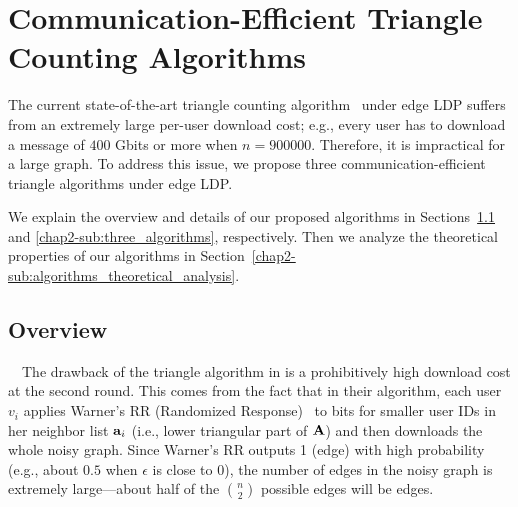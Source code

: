 \section{Communication-Efficient Triangle Counting Algorithms}
\label{chap2-sec:algorithms}
The current state-of-the-art triangle counting algorithm~\cite{Imola_USENIX21} under edge LDP suffers from an extremely large per-user download cost; 
e.g., every user has to download a message of $400$ Gbits or more when $n=900000$. 
Therefore, it is impractical for a large graph. 
To address this issue, we propose three communication-efficient triangle algorithms under edge LDP.

We explain the overview and details of our proposed algorithms in Sections~\ref{chap2-sub:algorithms_overview} and \ref{chap2-sub:three_algorithms}, respectively.
Then we analyze the theoretical properties of our algorithms in Section~\ref{chap2-sub:algorithms_theoretical_analysis}.

\subsection{Overview}
\label{chap2-sub:algorithms_overview}


{}~~The drawback of the triangle algorithm in \cite{Imola_USENIX21} is a prohibitively 
high 
download cost at the second round.
This comes from the fact that
in their algorithm, 
each user $v_i$ applies Warner's RR
(Randomized Response)~\cite{Warner_JASA65} to
bits for smaller user IDs in her neighbor list $\mathbf{a}_i$ (i.e., lower triangular part of $\mathbf{A}$)
and then downloads the whole noisy graph.
Since Warner's RR outputs 1 (edge) with high probability (e.g., about $0.5$ when $\epsilon$ is close to $0$), the
number of edges in the noisy graph is extremely large---about half of the $\binom{n}{2}$ possible edges will be edges.

